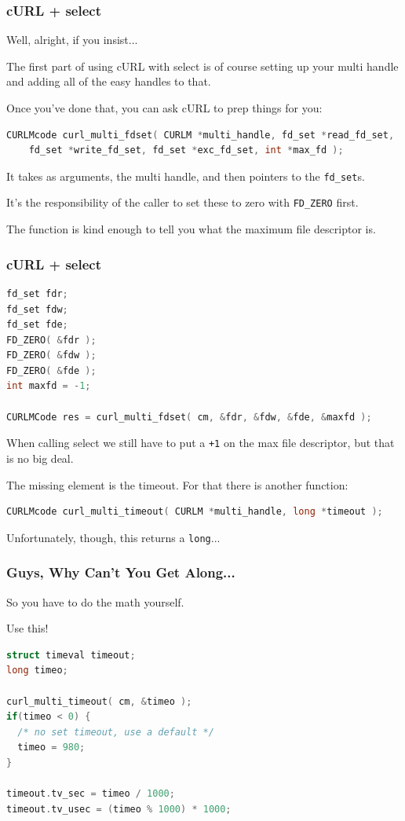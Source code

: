 \begin{frame}[fragile]
\frametitle{cURL + select}

Well, alright, if you insist...

The first part of using cURL with select is of course setting up your multi handle and adding all of the easy handles to that. 

Once you've done that, you can ask cURL to prep things for you:

\begin{lstlisting}[language=C]
CURLMcode curl_multi_fdset( CURLM *multi_handle, fd_set *read_fd_set,
    fd_set *write_fd_set, fd_set *exc_fd_set, int *max_fd );
\end{lstlisting}

It takes as arguments, the multi handle, and then pointers to the \texttt{fd\_set}s.

It's the responsibility of the caller to set these to zero with \texttt{FD\_ZERO} first. 

The function is kind enough to tell you what the maximum file descriptor is.

\end{frame}

\begin{frame}[fragile]
\frametitle{cURL + select}

\begin{lstlisting}[language=C]
fd_set fdr;
fd_set fdw;
fd_set fde;
FD_ZERO( &fdr );
FD_ZERO( &fdw );
FD_ZERO( &fde );
int maxfd = -1;

CURLMCode res = curl_multi_fdset( cm, &fdr, &fdw, &fde, &maxfd );
\end{lstlisting}

When calling select we still have to put a \texttt{+1} on the max file descriptor, but that is no big deal. 

The missing element is the timeout. For that there is another function:

\begin{lstlisting}[language=C]
CURLMcode curl_multi_timeout( CURLM *multi_handle, long *timeout );
\end{lstlisting}

Unfortunately, though, this returns a \texttt{long}...

\end{frame}


\begin{frame}[fragile]
\frametitle{Guys, Why Can't You Get Along...}

So you have to do the math yourself.

Use this!

\begin{lstlisting}[language=C]
struct timeval timeout;
long timeo;
 
curl_multi_timeout( cm, &timeo );
if(timeo < 0) {
  /* no set timeout, use a default */
  timeo = 980;
}
 
timeout.tv_sec = timeo / 1000;
timeout.tv_usec = (timeo % 1000) * 1000;
\end{lstlisting}

\end{frame}



